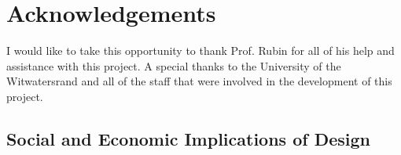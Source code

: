 \documentclass[11pt,onecolumn]{witseiepaper}
\begin{document}
\section*{Acknowledgements}

\noindent I would like to take this opportunity to thank Prof. Rubin for all of his help and assistance with this project. A special thanks to the University of the Witwatersrand and all of the staff that were involved in the development of this project.

\newpage
\printbibliography
\newpage
\begin{appendices}

\section{Social and Economic Implications of Design}
\label{app:nonTech}


\end{appendices}
\end{document}
